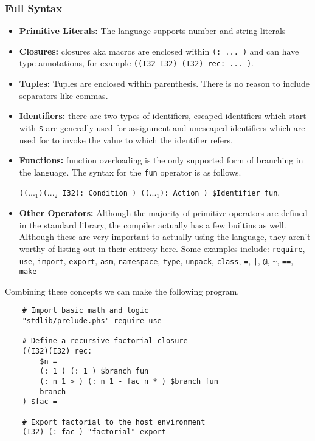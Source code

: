 \documentclass{article}
\begin{document}
\subsubsection{Full Syntax}
\begin{itemize}
    \item \textbf{Primitive Literals:} The language supports number and string literals

    \item \textbf{Closures:} closures aka macros are enclosed within \texttt{(: ... )} and can have type annotations, for example \texttt{((I32 I32) (I32) rec: ... )}.

    \item \textbf{Tuples:} Tuples are enclosed within parenthesis. There is no reason to include separators like commas.

    \item \textbf{Identifiers:} there are two types of identifiers, escaped identifiers which start with \texttt{\$} are generally used for assignment and unescaped identifiers which are used for to invoke the value to which the identifier refers.

    \item \textbf{Functions:} function overloading is the only supported form of branching in the language. The syntax for the \texttt{fun} operator is as follows. 

    \texttt{(($..._1$)($..._2$ I32): Condition ) (($..._1$): Action ) \$Identifier fun}.

    \item \textbf{Other Operators:} Although the majority of primitive operators are defined in the standard library, the compiler actually has a few builtins as well. Although these are very important to actually using the language, they aren't worthy of listing out in their entirety here. Some examples include: \texttt{require}, \texttt{use}, \texttt{import}, \texttt{export}, \texttt{asm}, \texttt{namespace}, \texttt{type}, \texttt{unpack}, \texttt{class}, \texttt{=}, \texttt{|}, \texttt{@}, \texttt{\~}, \texttt{==}, \texttt{make}
\end{itemize}
    
    Combining these concepts we can make the following program.
    
    \begin{verbatim}
    # Import basic math and logic
    "stdlib/prelude.phs" require use

    # Define a recursive factorial closure
    ((I32)(I32) rec:
        $n =
        (: 1 ) (: 1 ) $branch fun
        (: n 1 > ) (: n 1 - fac n * ) $branch fun
        branch
    ) $fac =
    
    # Export factorial to the host environment
    (I32) (: fac ) "factorial" export
    \end{verbatim}
    
\end{document}
